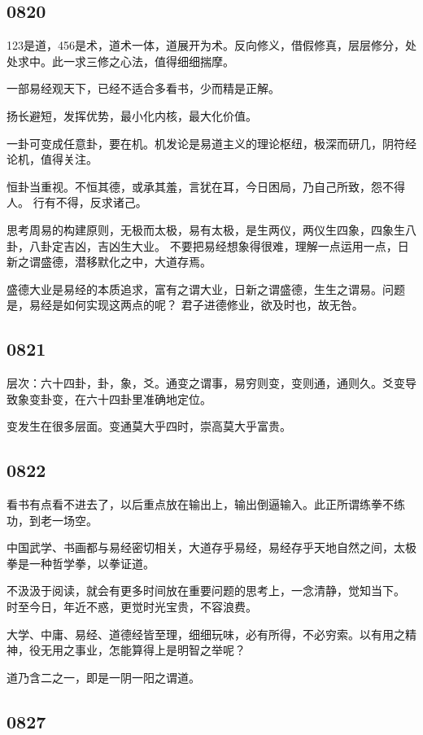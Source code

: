 \subsection{0820}

123是道，456是术，道术一体，道展开为术。反向修义，借假修真，层层修分，处处求中。此一求三修之心法，值得细细揣摩。

一部易经观天下，已经不适合多看书，少而精是正解。

扬长避短，发挥优势，最小化内核，最大化价值。

一卦可变成任意卦，要在机。机发论是易道主义的理论枢纽，极深而研几，阴符经论机，值得关注。

恒卦当重视。不恒其德，或承其羞，言犹在耳，今日困局，乃自己所致，怨不得人。
行有不得，反求诸己。

思考周易的构建原则，无极而太极，易有太极，是生两仪，两仪生四象，四象生八卦，八卦定吉凶，吉凶生大业。
不要把易经想象得很难，理解一点运用一点，日新之谓盛德，潜移默化之中，大道存焉。

盛德大业是易经的本质追求，富有之谓大业，日新之谓盛德，生生之谓易。问题是，易经是如何实现这两点的呢？
君子进德修业，欲及时也，故无咎。

\subsection{0821}

层次：六十四卦，卦，象，爻。通变之谓事，易穷则变，变则通，通则久。爻变导致象变卦变，在六十四卦里准确地定位。

变发生在很多层面。变通莫大乎四时，崇高莫大乎富贵。

\subsection{0822}

看书有点看不进去了，以后重点放在输出上，输出倒逼输入。此正所谓练拳不练功，到老一场空。

中国武学、书画都与易经密切相关，大道存乎易经，易经存乎天地自然之间，太极拳是一种哲学拳，以拳证道。

不汲汲于阅读，就会有更多时间放在重要问题的思考上，一念清静，觉知当下。
时至今日，年近不惑，更觉时光宝贵，不容浪费。

大学、中庸、易经、道德经皆至理，细细玩味，必有所得，不必穷索。以有用之精神，役无用之事业，怎能算得上是明智之举呢？

道乃含二之一，即是一阴一阳之谓道。

\subsection{0827}

